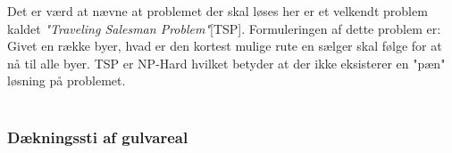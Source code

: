 \begin{itemize}
\end{itemize}
Det er værd at nævne at problemet der skal løses her er et velkendt problem kaldet \textit{"Traveling Salesman Problem"}[TSP]. Formuleringen af dette problem er: Givet en række byer, hvad er den kortest mulige rute en sælger skal følge for at nå til alle byer. TSP er NP-Hard hvilket betyder at der ikke eksisterer en "pæn" løsning på problemet. \\~\\

\subsubsection{Dækningssti af gulvareal}